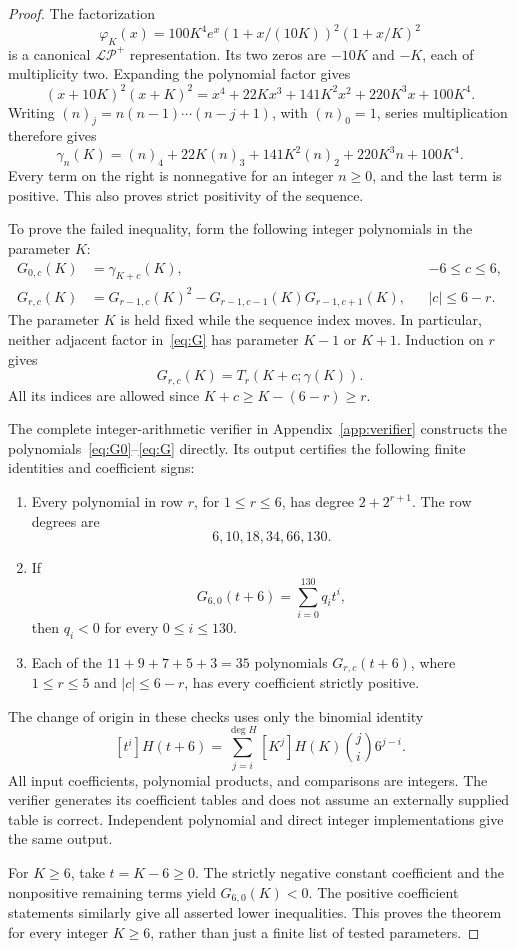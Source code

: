 \documentclass[11pt]{article}
\newcommand{\LP}{\mathcal{LP}^{+}}
\begin{document}
\begin{proof}
The factorization
\[
\varphi_K(x)=100K^4e^x(1+x/(10K))^2(1+x/K)^2
\]
is a canonical $\LP$ representation. Its two zeros are $-10K$ and $-K$,
each of multiplicity two. Expanding the polynomial factor gives
\[
(x+10K)^2(x+K)^2=x^4+22Kx^3+141K^2x^2+220K^3x+100K^4.
\]
Writing $(n)_j=n(n-1)\cdots(n-j+1)$, with $(n)_0=1$, series
multiplication therefore gives
\begin{equation}\label{eq:gamma}
\gamma_n(K)=(n)_4+22K(n)_3+141K^2(n)_2+220K^3n+100K^4.
\end{equation}
Every term on the right is nonnegative for an integer $n\ge0$, and the
last term is positive. This also proves strict positivity of the sequence.

To prove the failed inequality, form the following integer polynomials in
the parameter $K$:
\begin{align}
G_{0,c}(K)&=\gamma_{K+c}(K),&&-6\le c\le6,\label{eq:G0}\\
G_{r,c}(K)&=G_{r-1,c}(K)^2
 -G_{r-1,c-1}(K)G_{r-1,c+1}(K),&&|c|\le6-r.
\label{eq:G}
\end{align}
The parameter $K$ is held fixed while the sequence index moves. In
particular, neither adjacent factor in~\eqref{eq:G} has parameter $K-1$
or $K+1$. Induction on $r$ gives
\[
G_{r,c}(K)=T_r(K+c;\gamma(K)).
\]
All its indices are allowed since $K+c\ge K-(6-r)\ge r$.

The complete integer-arithmetic verifier in Appendix~\ref{app:verifier}
constructs the polynomials~\eqref{eq:G0}--\eqref{eq:G} directly. Its output
certifies the following finite identities and coefficient signs:
\begin{enumerate}
\item Every polynomial in row $r$, for $1\le r\le6$, has degree
$2+2^{r+1}$. The row degrees are
\[6,10,18,34,66,130.\]
\item If
\[
G_{6,0}(t+6)=\sum_{i=0}^{130}q_i t^i,
\]
then $q_i<0$ for every $0\le i\le130$.
\item Each of the $11+9+7+5+3=35$ polynomials
$G_{r,c}(t+6)$, where $1\le r\le5$ and $|c|\le6-r$, has every
coefficient strictly positive.
\end{enumerate}
The change of origin in these checks uses only the binomial identity
\[
[t^i]H(t+6)=\sum_{j=i}^{\deg H}[K^j]H(K)\binom ji6^{j-i}.
\]
All input coefficients, polynomial products, and comparisons are integers.
The verifier generates its coefficient tables and does not assume an
externally supplied table is correct. Independent polynomial and direct
integer implementations give the same output.

For $K\ge6$, take $t=K-6\ge0$. The strictly negative constant coefficient
and the nonpositive remaining terms yield $G_{6,0}(K)<0$. The positive
coefficient statements similarly give all asserted lower inequalities.
This proves the theorem for every integer $K\ge6$, rather than just a
finite list of tested parameters.
\end{proof}
\end{document}
